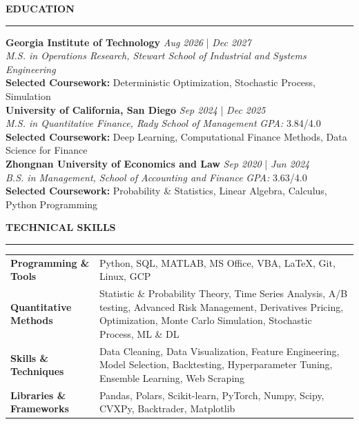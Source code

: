 \documentclass{resume} %
\renewcommand{\sectionskip}{\vspace{0.10cm}}        %
\renewcommand{\sectionlineskip}{\vspace{0.10cm}}
\renewenvironment{rSection}[1]{
\sectionskip
\textcolor{UC San Diego Blue}{\textbf{\large\bfseries\MakeUppercase{#1}}}

\sectionlineskip
\hrule
\begin{list}{}{
\setlength{\leftmargin}{0em}
}
\item[]
}{
\end{list}
}
\begin{document}
\thispagestyle{empty}

\begin{rSection}{EDUCATION}
{\bf Georgia Institute of Technology} \hfill {\em Aug 2026} | {\em Dec 2027}
\\ \textit{M.S. in Operations Research, Stewart School of Industrial and Systems Engineering} \hfill \textit{} \\
\textbf{Selected Coursework:} Deterministic Optimization, Stochastic Process, Simulation \\
{\bf University of California, San Diego} \hfill {\em Sep 2024} | {\em Dec 2025}
\\ \textit{M.S. in Quantitative Finance, Rady School of Management} \hfill \textit{GPA:} 3.84/4.0 \\
\textbf{Selected Coursework:} Deep Learning, Computational Finance Methods, Data Science for Finance \\
{\bf Zhongnan University of Economics and Law} \hfill {\em Sep 2020} | {\em Jun 2024}
\\ \textit{B.S. in Management, School of Accounting and Finance} \hfill \textit{GPA:} 3.63/4.0 \\
\textbf{Selected Coursework:} Probability \& Statistics, Linear Algebra, Calculus, Python Programming
\end{rSection}


\begin{rSection}{TECHNICAL SKILLS} \itemsep -2pt
\begin{tabularx}{\textwidth}{@{} >{\bfseries}l >{\raggedleft\arraybackslash}X @{}}
Programming \& Tools & Python, SQL, MATLAB, MS Office, VBA, \LaTeX, Git, Linux, GCP  \\
Quantitative Methods & Statistic \& Probability Theory, Time Series Analysis, A/B testing, Advanced Risk Management, Derivatives Pricing, Optimization, Monte Carlo Simulation, Stochastic Process, ML \& DL \\
Skills \& Techniques & Data Cleaning, Data Visualization, Feature Engineering, Model Selection, Backtesting, Hyperparameter Tuning, Ensemble Learning, Web Scraping \\
Libraries \& Frameworks  & Pandas, Polars, Scikit-learn, PyTorch, Numpy, Scipy, CVXPy, Backtrader, Matplotlib\\
\end{tabularx}
\end{rSection}
\end{document}
